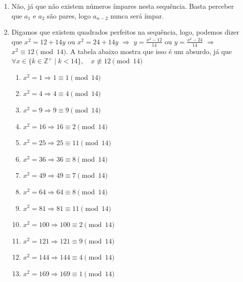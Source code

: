 \documentclass[12pt]{article}
\begin{document}
      \begin{enumerate}[label=(\textbf{\alph*})]
        \item  Não, já que não existem números ímpares nesta sequência. Basta perceber
          que $a_1$ e $a_2$ são pares, logo $a_{n-2}$ nunca será ímpar.

        \item  Digamos que existem quadrados perfeitos na sequência, logo, podemos dizer 
          que $x^2 = 12 + 14y$ ou $x^2 = 24 + 14y$ $\Rightarrow$ $y = \frac{x^2 - 12}{14}$
          ou $y = \frac{x^2 - 24}{14}$ $\Rightarrow$ $x^2 \equiv 12 \pmod{14}$. A tabela
          abaixo mostra que isso é um absurdo, já que $\forall x \in \{k \in \mathbb
          {Z}^+ \mid k < 14 \}, \quad x \not\equiv 12 \pmod{14}$
          \begin{multicols}{2}
            \begin{enumerate}[label={\arabic*}]
              \item $x^2 = 1 \Rightarrow 1 \equiv 1 \pmod{14}$
              \item $x^2 = 4 \Rightarrow 4 \equiv 4 \pmod{14}$
              \item $x^2 = 9 \Rightarrow 9 \equiv 9 \pmod{14}$
              \item $x^2 = 16 \Rightarrow 16 \equiv 2 \pmod{14}$
              \item $x^2 = 25 \Rightarrow 25 \equiv 11 \pmod{14}$
              \item $x^2 = 36 \Rightarrow 36 \equiv 8 \pmod{14}$
              \item $x^2 = 49 \Rightarrow 49 \equiv 7 \pmod{14}$
              \item $x^2 = 64 \Rightarrow 64 \equiv 8 \pmod{14}$
              \item $x^2 = 81 \Rightarrow 81 \equiv 11 \pmod{14}$
              \item $x^2 = 100 \Rightarrow 100 \equiv 2 \pmod{14}$
              \item $x^2 = 121 \Rightarrow 121 \equiv 9 \pmod{14}$
              \item $x^2 = 144 \Rightarrow 144 \equiv 4 \pmod{14}$
              \item $x^2 = 169 \Rightarrow 169 \equiv 1 \pmod{14}$
            \end{enumerate}
          \end{multicols}
      \end{enumerate}

    \clearpage
\end{document}
